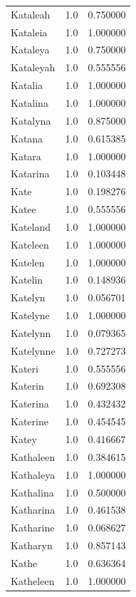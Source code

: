 \documentclass[
  letterpaper,
  DIV=11,
  numbers=noendperiod]{scrreprt}
\begin{document}
\begin{tabular}{lrr}
Kataleah        &   1.0 &   0.750000 \\
Kataleia        &   1.0 &   1.000000 \\
Kataleya        &   1.0 &   0.750000 \\
Kataleyah       &   1.0 &   0.555556 \\
Katalia         &   1.0 &   1.000000 \\
Katalina        &   1.0 &   1.000000 \\
Katalyna        &   1.0 &   0.875000 \\
Katana          &   1.0 &   0.615385 \\
Katara          &   1.0 &   1.000000 \\
Katarina        &   1.0 &   0.103448 \\
Kate            &   1.0 &   0.198276 \\
Katee           &   1.0 &   0.555556 \\
Kateland        &   1.0 &   1.000000 \\
Kateleen        &   1.0 &   1.000000 \\
Katelen         &   1.0 &   1.000000 \\
Katelin         &   1.0 &   0.148936 \\
Katelyn         &   1.0 &   0.056701 \\
Katelyne        &   1.0 &   1.000000 \\
Katelynn        &   1.0 &   0.079365 \\
Katelynne       &   1.0 &   0.727273 \\
Kateri          &   1.0 &   0.555556 \\
Katerin         &   1.0 &   0.692308 \\
Katerina        &   1.0 &   0.432432 \\
Katerine        &   1.0 &   0.454545 \\
Katey           &   1.0 &   0.416667 \\
Kathaleen       &   1.0 &   0.384615 \\
Kathaleya       &   1.0 &   1.000000 \\
Kathalina       &   1.0 &   0.500000 \\
Katharina       &   1.0 &   0.461538 \\
Katharine       &   1.0 &   0.068627 \\
Katharyn        &   1.0 &   0.857143 \\
Kathe           &   1.0 &   0.636364 \\
Katheleen       &   1.0 &   1.000000 \\

\end{tabular}
\end{document}
